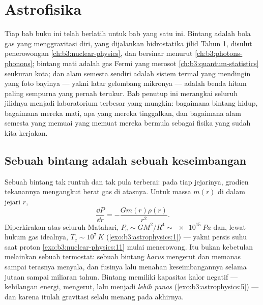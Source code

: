 \chapter{Astrofisika}\label{ch:b3:astrophysics}


Tiap bab buku ini telah berlatih untuk bab yang satu ini. Bintang
adalah bola gas yang menggravitasi diri, yang dijalankan hidrostatika jilid
Tahun 1, disulut penerowongan \cref{ch:b3:nuclear-physics}, dan bersinar
menurut  \cref{ch:b3:photons-phonons}; bintang mati adalah
gas Fermi yang merosot \cref{ch:b3:quantum-statistics} seukuran
kota; dan alam semesta sendiri adalah sistem termal yang mendingin yang
foto bayinya --- yakni latar gelombang mikronya --- adalah benda hitam
paling sempurna yang pernah terukur. Bab penutup ini merangkai seluruh
jilidnya menjadi laboratorium terbesar yang mungkin: bagaimana bintang
hidup, bagaimana mereka mati, apa yang mereka tinggalkan, dan bagaimana alam
semesta yang memuai yang memuat mereka bermula sebagai fisika yang sudah kita kerjakan.

\section{Sebuah bintang adalah sebuah keseimbangan}

\begin{proposition}\label{prop:b3:astrophysics:hydrostatic}
Sebuah bintang tak runtuh dan tak pula terberai: pada tiap jejarinya,
gradien tekanannya mengangkut berat gas di atasnya. Untuk
massa $m(r)$ di dalam jejari $r$,
\[
\frac{\dd P}{\dd r} = -\frac{Gm(r)\rho(r)}{r^2} .
\]
Diperkirakan atas seluruh Matahari, $P_{\text{c}} \sim GM^2/R^4 \sim
\qty{e15}{Pa}$ dan, lewat hukum gas idealnya, $T_{\text{c}} \sim
10^7\,\unit{K}$ (\cref{exo:b3:astrophysics:1}) --- yakni persis suhu
saat proton \cref{exo:b3:nuclear-physics:11}
mulai menerowong. Itu bukan kebetulan melainkan sebuah termostat: sebuah bintang
\emph{harus} mengerut dan memanas sampai terasnya menyala, dan fusinya
lalu menahan keseimbangannya selama jutaan sampai miliaran tahun. Bintang
memiliki kapasitas kalor negatif --- kehilangan energi, mengerut, lalu menjadi
\emph{lebih panas} (\cref{exo:b3:astrophysics:5}) --- dan karena itulah
gravitasi selalu menang pada akhirnya.
\end{proposition}

